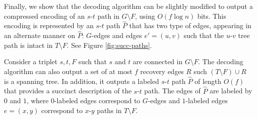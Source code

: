 %
Finally, we show that the decoding algorithm can be slightly modified to output a compressed encoding of an $s$-$t$ path in $G \setminus F$, using $O(f\log n)$ bits. This encoding is represented by an $s$-$t$ path $\widehat{P}$ that has two type of edges, appearing in an alternate manner on  $\widehat{P}$: $G$-edges and edges $e'=(u,v)$ such that the $u$-$v$ tree path is intact in $T \setminus F$. See Figure \ref{fig:succ-paths}. 
\begin{lemma}\label{lem:useful-recovery-edges}
Consider a triplet $s,t,F$ such that $s$ and $t$ are connected in $G \setminus F$. 
The decoding algorithm can also output a set of at most $f$ recovery edges $R$ such $(T \setminus F) \cup R$ is a spanning tree. In addition, it outputs a labeled $s$-$t$ path $\widehat{P}$ of length $O(f)$ that provides a succinct description of the $s$-$t$ path. The edges of $\widehat{P}$ are labeled by $0$ and $1$, where $0$-labeled edges correspond to $G$-edges and $1$-labeled edges $e=(x,y)$ correspond to $x$-$y$ paths in $T \setminus F$. 
\end{lemma}
